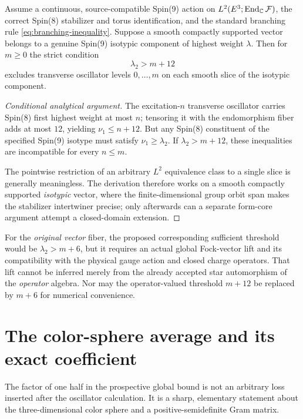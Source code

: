\begin{proposition}\label{prop:operator-lowlevel}
Assume a continuous, source-compatible Spin(9) action on
$L^2(E^3;\operatorname{End}_{\mathbb C}\mathcal F)$, the correct
Spin(8) stabilizer and torus identification, and the standard
branching rule \eqref{eq:branching-inequality}. Suppose a smooth
compactly supported vector belongs to a genuine Spin(9) isotypic
component of highest weight $\lambda$. Then for $m\ge0$ the strict
condition
\begin{equation}\label{eq:op-threshold}
   \lambda_2>m+12
\end{equation}
excludes transverse oscillator levels $0,\ldots,m$ on each smooth
slice of the isotypic component.
\end{proposition}
\begin{proof}[Conditional analytical argument]
The excitation-$n$ transverse oscillator carries Spin(8) first
highest weight at most $n$; tensoring it with the endomorphism
fiber adds at most $12$, yielding $\nu_1\le n+12$. But any Spin(8)
constituent of the specified Spin(9) isotype must satisfy
$\nu_1\ge\lambda_2$. If $\lambda_2>m+12$, these inequalities
are incompatible for every $n\le m$.

The pointwise restriction of an arbitrary $L^2$ equivalence class to
a single slice is generally meaningless. The derivation therefore
works on a smooth compactly supported \emph{isotypic} vector, where
the finite-dimensional group orbit span makes the stabilizer
intertwiner precise; only afterwards can a separate form-core
argument attempt a closed-domain extension.
\end{proof}

For the \emph{original vector} fiber, the proposed corresponding
sufficient threshold would be $\lambda_2>m+6$, but it requires an
actual global Fock-vector lift and its compatibility with the
physical gauge action and closed charge operators. That lift cannot
be inferred merely from the already accepted star automorphism of
the \emph{operator} algebra. Nor may the operator-valued threshold
$m+12$ be replaced by $m+6$ for numerical convenience.

\section{The color-sphere average and its exact coefficient}
The factor of one half in the prospective global bound is not an
arbitrary loss inserted after the oscillator calculation. It is a
sharp, elementary statement about the three-dimensional color
sphere and a positive-semidefinite Gram matrix.

